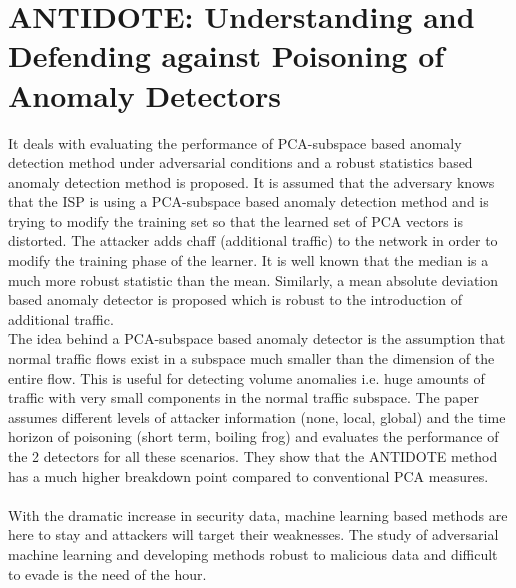 \documentclass[11pt]{article}
\begin{document}
\section{ANTIDOTE: Understanding and Defending against Poisoning of Anomaly Detectors} It deals with evaluating the performance of PCA-subspace based anomaly detection method under adversarial conditions and a robust statistics based anomaly detection method is proposed. It is assumed that the adversary knows that the ISP is using a PCA-subspace based anomaly detection method and is trying to modify the training set so that the learned set of PCA vectors is distorted. The attacker adds chaff (additional traffic) to the network in order to modify the training phase of the learner. It is well known that the median is a much more robust statistic than the mean. Similarly, a mean absolute deviation based anomaly detector is proposed which is robust to the introduction of additional traffic. \\
The idea behind a PCA-subspace based anomaly detector is the assumption that normal traffic flows exist in a subspace much smaller than the dimension of the entire flow. This is useful for detecting volume anomalies i.e. huge amounts of traffic with very small components in the normal traffic subspace. The paper assumes different levels of attacker information (none, local, global) and the time horizon of poisoning (short term, boiling frog) and evaluates the performance of the 2 detectors for all these scenarios. They show that the ANTIDOTE method has a much higher breakdown point compared to conventional PCA measures. \\ \\
With the dramatic increase in security data, machine learning based methods are here to stay and attackers will target their weaknesses. The study of adversarial machine learning and developing methods robust to malicious data and difficult to evade is the need of the hour.
\end{document}
